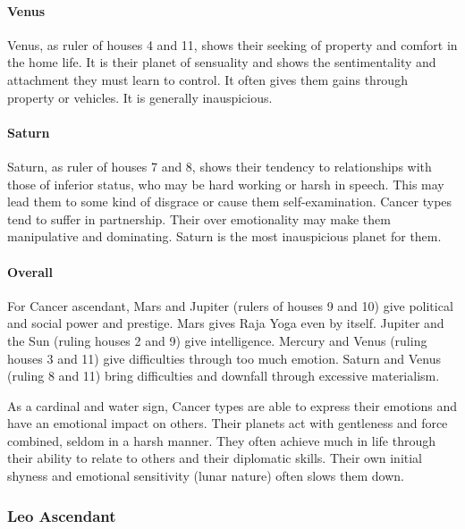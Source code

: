  

\paragraph{Venus}

Venus, as ruler of houses 4 and 11, shows their seeking of property and comfort in the home life. It is their planet of sensuality and shows the sentimentality and attachment they must learn to control. It often gives them gains through property or vehicles. It is generally inauspicious.

 

\paragraph{Saturn}

Saturn, as ruler of houses 7 and 8, shows their tendency to relationships with those of inferior status, who may be hard working or harsh in speech. This may lead them to some kind of disgrace or cause them self-examination. Cancer types tend to suffer in partnership. Their over emotionality may make them manipulative and dominating. Saturn is the most inauspicious planet for them.

 

\paragraph{Overall}

For Cancer ascendant, Mars and Jupiter (rulers of houses 9 and 10) give political and social power and prestige. Mars gives Raja Yoga even by itself. Jupiter and the Sun (ruling houses 2 and 9) give intelligence. Mercury and Venus (ruling houses 3 and 11) give difficulties through too much emotion. Saturn and Venus (ruling 8 and 11) bring difficulties and downfall through excessive materialism.

 

As a cardinal and water sign, Cancer types are able to express their emotions and have an emotional impact on others. Their planets act with gentleness and force combined, seldom in a harsh manner. They often achieve much in life through their ability to relate to others and their diplomatic skills. Their own initial shyness and emotional sensitivity (lunar nature) often slows them down.

 

\subsubsection{Leo Ascendant}
 

